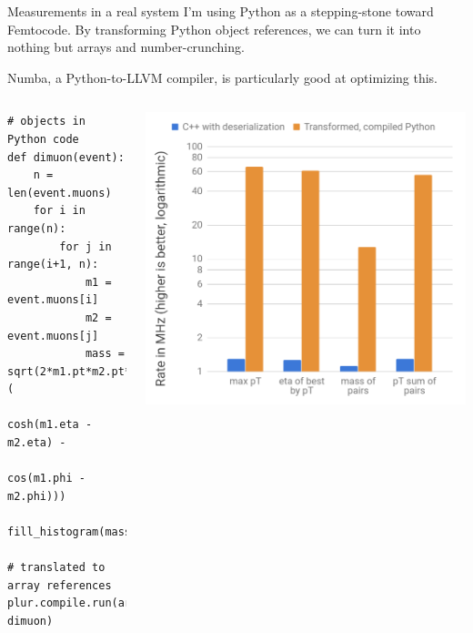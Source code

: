 \documentclass[aspectratio=169]{beamer}
\begin{document}
\begin{frame}[fragile]{Measurements in a real system}
\vspace{0.5 cm}
I'm using Python as a stepping-stone toward Femtocode. By transforming Python object references, we can turn it into nothing but arrays and number-crunching.

\vspace{0.2 cm}
Numba, a Python-to-LLVM compiler, is particularly good at optimizing this.

\begin{columns}[c]
\scriptsize
\begin{verbatim}
# objects in Python code
def dimuon(event):
    n = len(event.muons)
    for i in range(n):
        for j in range(i+1, n):
            m1 = event.muons[i]
            m2 = event.muons[j]
            mass = sqrt(2*m1.pt*m2.pt*(
                cosh(m1.eta - m2.eta) -
                cos(m1.phi - m2.phi)))
            fill_histogram(mass)

# translated to array references
plur.compile.run(arrays, dimuon)
\end{verbatim}

\includegraphics[width=\linewidth]{plur-vs-cpp.png}

\end{columns}
\end{frame}
\end{document}
